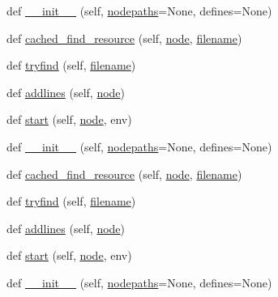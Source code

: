 \begin{DoxyCompactItemize}
\item 
def \hyperlink{classwaflib_1_1_tools_1_1c__preproc_1_1c__parser_aa06a68f192a6f93ba1587fa653d57eaa}{\+\_\+\+\_\+init\+\_\+\+\_\+} (self, \hyperlink{classwaflib_1_1_tools_1_1c__preproc_1_1c__parser_a175b9d997a489166cdfbff084ded4adf}{nodepaths}=None, defines=None)
\item 
def \hyperlink{classwaflib_1_1_tools_1_1c__preproc_1_1c__parser_a05773b7fed7398fc94fb3393dca8b641}{cached\+\_\+find\+\_\+resource} (self, \hyperlink{structnode}{node}, \hyperlink{test__portburn_8cpp_a7efa5e9c7494c7d4586359300221aa5d}{filename})
\item 
def \hyperlink{classwaflib_1_1_tools_1_1c__preproc_1_1c__parser_a7cbdc05f2fac61f5b962f558d18bf7ab}{tryfind} (self, \hyperlink{test__portburn_8cpp_a7efa5e9c7494c7d4586359300221aa5d}{filename})
\item 
def \hyperlink{classwaflib_1_1_tools_1_1c__preproc_1_1c__parser_a9a0cb675b91f0ce6d65109e1b67bcc69}{addlines} (self, \hyperlink{structnode}{node})
\item 
def \hyperlink{classwaflib_1_1_tools_1_1c__preproc_1_1c__parser_ada08ffe0c9d9fcf8d55b3e35927511e6}{start} (self, \hyperlink{structnode}{node}, env)
\item 
def \hyperlink{classwaflib_1_1_tools_1_1c__preproc_1_1c__parser_aa06a68f192a6f93ba1587fa653d57eaa}{\+\_\+\+\_\+init\+\_\+\+\_\+} (self, \hyperlink{classwaflib_1_1_tools_1_1c__preproc_1_1c__parser_a175b9d997a489166cdfbff084ded4adf}{nodepaths}=None, defines=None)
\item 
def \hyperlink{classwaflib_1_1_tools_1_1c__preproc_1_1c__parser_a05773b7fed7398fc94fb3393dca8b641}{cached\+\_\+find\+\_\+resource} (self, \hyperlink{structnode}{node}, \hyperlink{test__portburn_8cpp_a7efa5e9c7494c7d4586359300221aa5d}{filename})
\item 
def \hyperlink{classwaflib_1_1_tools_1_1c__preproc_1_1c__parser_a7cbdc05f2fac61f5b962f558d18bf7ab}{tryfind} (self, \hyperlink{test__portburn_8cpp_a7efa5e9c7494c7d4586359300221aa5d}{filename})
\item 
def \hyperlink{classwaflib_1_1_tools_1_1c__preproc_1_1c__parser_a9a0cb675b91f0ce6d65109e1b67bcc69}{addlines} (self, \hyperlink{structnode}{node})
\item 
def \hyperlink{classwaflib_1_1_tools_1_1c__preproc_1_1c__parser_ada08ffe0c9d9fcf8d55b3e35927511e6}{start} (self, \hyperlink{structnode}{node}, env)
\item 
def \hyperlink{classwaflib_1_1_tools_1_1c__preproc_1_1c__parser_aa06a68f192a6f93ba1587fa653d57eaa}{\+\_\+\+\_\+init\+\_\+\+\_\+} (self, \hyperlink{classwaflib_1_1_tools_1_1c__preproc_1_1c__parser_a175b9d997a489166cdfbff084ded4adf}{nodepaths}=None, defines=None)

\end{DoxyCompactItemize}
